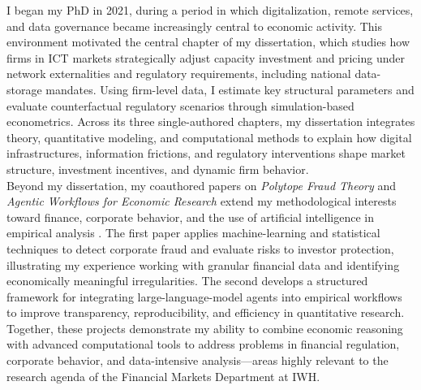\documentclass{nfr}
\begin{document}
I began my PhD in 2021, during a period in which digitalization, remote services, and data governance became increasingly central to economic activity. 
This environment motivated the central chapter of my dissertation, which studies how firms in ICT markets strategically adjust capacity investment and pricing under network externalities and regulatory requirements, including national data-storage mandates. 
Using firm-level data, I estimate key structural parameters and evaluate counterfactual regulatory scenarios through simulation-based econometrics. 
Across its three single-authored chapters, my dissertation integrates theory, quantitative modeling, and computational methods to explain how digital infrastructures, information frictions, and regulatory interventions shape market structure, investment incentives, and dynamic firm behavior.\\

Beyond my dissertation, my coauthored papers on \textit{Polytope Fraud Theory} and \textit{Agentic Workflows for Economic Research} extend my methodological interests toward finance, corporate behavior, and the use of artificial intelligence in empirical analysis \citep{Zhao2025, Dawid2025}. 
The first paper applies machine-learning and statistical techniques to detect corporate fraud and evaluate risks to investor protection, illustrating my experience working with granular financial data and identifying economically meaningful irregularities. 
The second develops a structured framework for integrating large-language-model agents into empirical workflows to improve transparency, reproducibility, and efficiency in quantitative research. 
Together, these projects demonstrate my ability to combine economic reasoning with advanced computational tools to address problems in financial regulation, corporate behavior, and data-intensive analysis—areas highly relevant to the research agenda of the Financial Markets Department at IWH.\\
\end{document}
